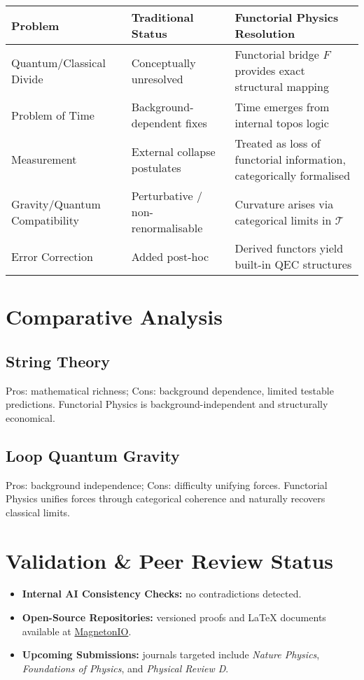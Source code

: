 \documentclass[11pt]{article}
\begin{document}
\begin{center}
\renewcommand{\arraystretch}{1.5}
\begin{tabular}{|p{4cm}|p{4.5cm}|p{5.5cm}|}
\hline
\textbf{Problem} & \textbf{Traditional Status} & \textbf{Functorial Physics Resolution} \\
\hline
Quantum/Classical Divide & Conceptually unresolved & Functorial bridge $F$ provides exact structural mapping \\
\hline
Problem of Time & Background-dependent fixes & Time emerges from internal topos logic \\
\hline
Measurement & External collapse postulates & Treated as loss of functorial information, categorically formalised \\
\hline
Gravity/Quantum Compatibility & Perturbative / non-renormalisable & Curvature arises via categorical limits in $\mathcal{T}$ \\
\hline
Error Correction & Added post-hoc & Derived functors yield built-in QEC structures \\
\hline
\end{tabular}
\end{center}

\section{Comparative Analysis}
\subsection{String Theory}
Pros: mathematical richness; Cons: background dependence, limited testable predictions. Functorial Physics is background-independent and structurally economical.

\subsection{Loop Quantum Gravity}
Pros: background independence; Cons: difficulty unifying forces. Functorial Physics unifies forces through categorical coherence and naturally recovers classical limits.

\section{Validation \& Peer Review Status}
\begin{itemize}
\item \textbf{Internal AI Consistency Checks:} no contradictions detected.
\item \textbf{Open-Source Repositories:} versioned proofs and LaTeX documents available at \href{https://github.com/MagnetonIO}{MagnetonIO}.
\item \textbf{Upcoming Submissions:} journals targeted include \emph{Nature Physics}, \emph{Foundations of Physics}, and \emph{Physical Review D}.
\end{itemize}
\end{document}
